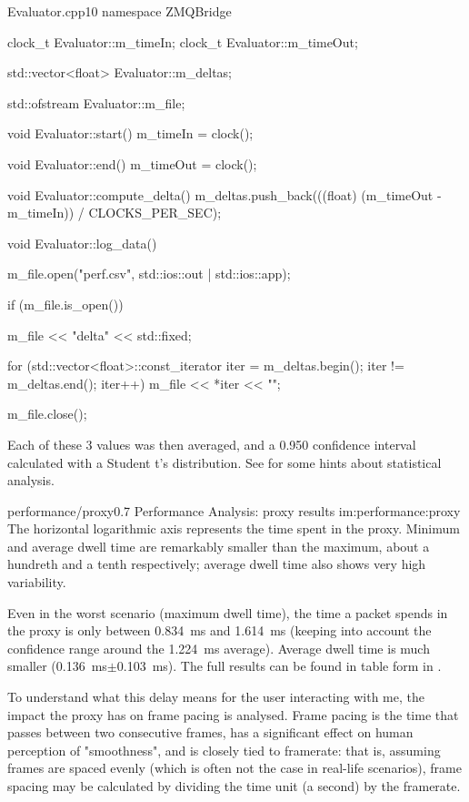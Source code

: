 \begin{codelist}{Evaluator.cpp}{10}
namespace ZMQBridge {

clock_t Evaluator::m_timeIn;
clock_t Evaluator::m_timeOut;

std::vector<float> Evaluator::m_deltas;

std::ofstream Evaluator::m_file;

void Evaluator::start() {
    m_timeIn = clock();
}

void Evaluator::end() {
    m_timeOut = clock();
}

void Evaluator::compute_delta() {
    m_deltas.push_back(((float) (m_timeOut - m_timeIn)) / CLOCKS_PER_SEC);
}

void Evaluator::log_data() {
    m_file.open("perf.csv", std::ios::out | std::ios::app);

    if (m_file.is_open()) {
        m_file << "delta\n"
               << std::fixed;

        for (std::vector<float>::const_iterator iter = m_deltas.begin(); iter != m_deltas.end(); iter++) {
            m_file << *iter << "\n";
        }
    }

    m_file.close();
}

}
\end{codelist}

\FLOATnoindent Each of these \num{3} values was then averaged, and a \num{0,950} confidence interval calculated with a Student t's distribution. See  for some hints about statistical analysis.

\begin{image}
	{performance/proxy}{0.7}
	{Performance Analysis: proxy results}
	{im:performance:proxy}
	{}
	{The horizontal logarithmic axis represents the time spent in the \gls{proxy}. Minimum and average dwell time are remarkably smaller than the maximum, about a hundreth and a tenth respectively; average dwell time also shows very high variability.}
\end{image}

Even in the worst scenario (maximum dwell time), the time a \gls{packet} spends in the \gls{proxy} is only between \SI{0,834}{\milli\second} and \SI{1,614}{\milli\second} (keeping into account the confidence range around the \SI{1,224}{\milli\second} average). Average dwell time is much smaller (\SI{0,136}{\milli\second}$\pm$\SI{0,103}{\milli\second}).  The full results can be found in table form in .

To understand what this delay means for the user interacting with \gls{me}, the impact the \gls{proxy} has on frame pacing is analysed. Frame pacing is the time that passes between two consecutive frames, has a significant effect on human perception of "smoothness", and is closely tied to \gls{framerate}: that is, assuming frames are spaced evenly (which is often not the case in real-life scenarios), frame spacing may be calculated by dividing the time unit (a second) by the \gls{framerate}.

